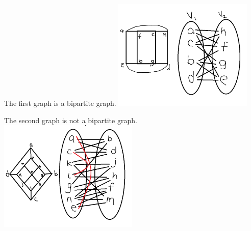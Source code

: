 \documentclass{article}
\begin{document}
The first graph is a bipartite graph.\newline{}
\includegraphics[height=200px]{hw2q16a.png}\newline{}

The second graph is not a bipartite graph.\newline{}
\includegraphics[height=200px]{hw2q16b.png}\newline{}
\end{document}

